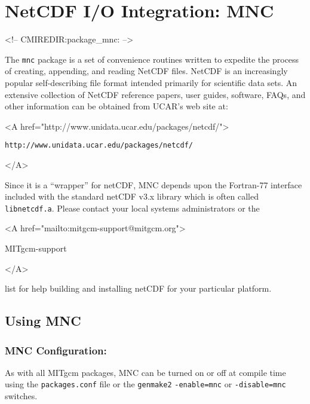 
\section{NetCDF I/O Integration: MNC}
\label{sec:pkg:mnc}
\begin{rawhtml}
<!-- CMIREDIR:package_mnc: -->
\end{rawhtml}

The \texttt{mnc} package is a set of convenience routines written to
expedite the process of creating, appending, and reading NetCDF files.
NetCDF is an increasingly popular self-describing file format
\cite{rew:97} intended primarily for scientific data sets.  An
extensive collection of NetCDF reference papers, user guides,
software, FAQs, and other information can be obtained from UCAR's web
site at:
\begin{rawhtml} <A href="http://www.unidata.ucar.edu/packages/netcdf/"> \end{rawhtml}
\begin{verbatim}
http://www.unidata.ucar.edu/packages/netcdf/
\end{verbatim}
\begin{rawhtml} </A> \end{rawhtml}

Since it is a ``wrapper'' for netCDF, MNC depends upon the Fortran-77
interface included with the standard netCDF v3.x library which is
often called \texttt{libnetcdf.a}.  Please contact your local systems
administrators or the
\begin{rawhtml} <A href="mailto:mitgcm-support@mitgcm.org"> \end{rawhtml}
MITgcm-support
\begin{rawhtml} </A> \end{rawhtml}
list for help building and installing netCDF for your particular
platform.


\subsection{Using MNC}

\subsubsection{MNC Configuration:}

As with all MITgcm packages, MNC can be turned on or off at compile time
using the \texttt{packages.conf} file or the \texttt{genmake2}
\texttt{-enable=mnc} or \texttt{-disable=mnc} switches.

